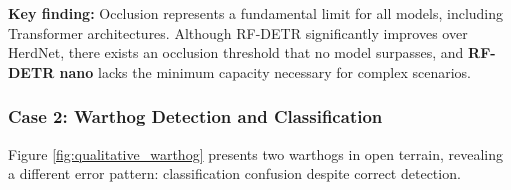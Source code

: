 \textbf{Key finding:} Occlusion represents a fundamental limit for all models, including Transformer architectures. Although RF-DETR significantly improves over HerdNet, there exists an occlusion threshold that no model surpasses, and \textbf{RF-DETR nano} lacks the minimum capacity necessary for complex scenarios.

%
%
%

\subsubsection{Case 2: Warthog Detection and Classification}

Figure \ref{fig:qualitative_warthog} presents two warthogs in open terrain, revealing a different error pattern: classification confusion despite correct detection.

